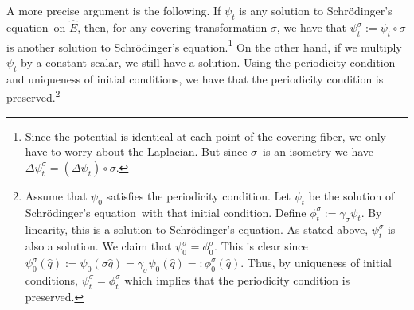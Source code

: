 \documentclass[11pt]{article}
\theoremstyle{remark}
\begin{document}
A more precise
argument is the following. If $\ensuremath{\psi}_t$ is any solution to Schr\"odinger's equation\ on
$\ensuremath{\widehat{E}}$,  then, for any covering transformation $\ensuremath{\sigma}$, we have
that $\ensuremath{\psi}_t^{\ensuremath{\sigma}} \ensuremath{:=} \ensuremath{\psi}_t \circ \ensuremath{\sigma}$ is another solution to
Schr\"odinger's equation.\footnote{Since the potential is identical at each point  of the
covering fiber, we only have to worry about the Laplacian. But since \ensuremath{\sigma}\
is an isometry we have $\ensuremath{\Delta} \ensuremath{\psi}_t^{\ensuremath{\sigma}} = (\ensuremath{\Delta} \ensuremath{\psi}_t) \circ
{\ensuremath{\sigma}}$.} On the other hand, if we multiply $\ensuremath{\psi}_t$ 
by a constant scalar, we still have a
solution. Using the periodicity condition and uniqueness of initial
conditions, we have that
the periodicity condition is preserved.\footnote{
Assume that $\ensuremath{\psi}_0$   satisfies the periodicity
condition. Let $\ensuremath{\psi}_t$ be the solution of Schr\"odinger's equation\ with that initial
condition. Define $\phi_t^{\ensuremath{\sigma}} \ensuremath{:=} \ensuremath{\gamma_{\ensuremath{\sigma}}} \ensuremath{\psi}_t$. By linearity, this is
a solution to Schr\"odinger's equation. As stated above, $\ensuremath{\psi}_t^{\ensuremath{\sigma}}$ is also a
solution. We claim that $\ensuremath{\psi}_0^{\ensuremath{\sigma}} = \phi_0^{\ensuremath{\sigma}}$. This is
clear since $\ensuremath{\psi}_0^{\ensuremath{\sigma}} (\ensuremath{\hat{q}})  \ensuremath{:=} \ensuremath{\psi}_0 (\ensuremath{\sigma}\ensuremath{\hat{q}}) = \ensuremath{\gamma_{\ensuremath{\sigma}}}
\ensuremath{\psi}_0(\ensuremath{\hat{q}}) \ensuremath{=:}  \phi_0^{\ensuremath{\sigma}} (\ensuremath{\hat{q}}) $. Thus, by uniqueness of
initial conditions, $\ensuremath{\psi}_t^{\ensuremath{\sigma}} = \phi_t^{\ensuremath{\sigma}}$ which implies
that the periodicity condition is preserved.}
\end{document}
